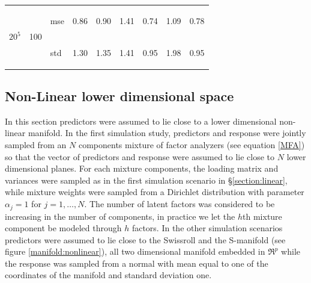 \documentclass{article} %
\newcommand{\efoo}{\end{footnotesize}}
\newcommand{\bfoo}{\begin{footnotesize}}
\begin{document}
\begin{table}[t]
\begin{center}
\begin{small}
\begin{sc}
\begin{tabular}{lllcccccc}
\multirow{2}{*}{$20^5$}&\multirow{2}{*}{100}&\bfoo mse\efoo&0.86&0.90&1.41&0.74&1.09&0.78\\
&&\bfoo std\efoo &1.30&1.35&1.41&0.95&1.98&0.95\\
%
\hline
\end{tabular}
\end{sc}
\end{small}
\end{center}
\vskip -0.1in
\end{table}

\subsection{Non-Linear lower dimensional space}

In this section predictors were assumed to lie close to a lower dimensional non-linear manifold. In the first simulation study, predictors and response were jointly sampled from an $N$ components mixture of factor analyzers (see equation \ref{MFA}) so that the vector of predictors and response were assumed to lie close to $N$ lower dimensional planes. For each mixture components, the loading matrix and variances were sampled as in the first simulation scenario in \S \ref{section:linear}, while mixture weights were sampled from a Dirichlet distribution with parameter $\alpha_j=1$ for $j=1, \ldots, N$. The number of latent factors was considered to be increasing in the number of components, in practice we let the $h$th mixture component be modeled through $h$ factors. In the other simulation scenarios predictors were assumed to lie close to the Swissroll and the S-manifold (see figure \ref{manifold:nonlinear}), all two dimensional manifold embedded in $\Re^p$ while the response was sampled from a normal with mean equal to one of the coordinates of the manifold and standard deviation one.
\end{document}
